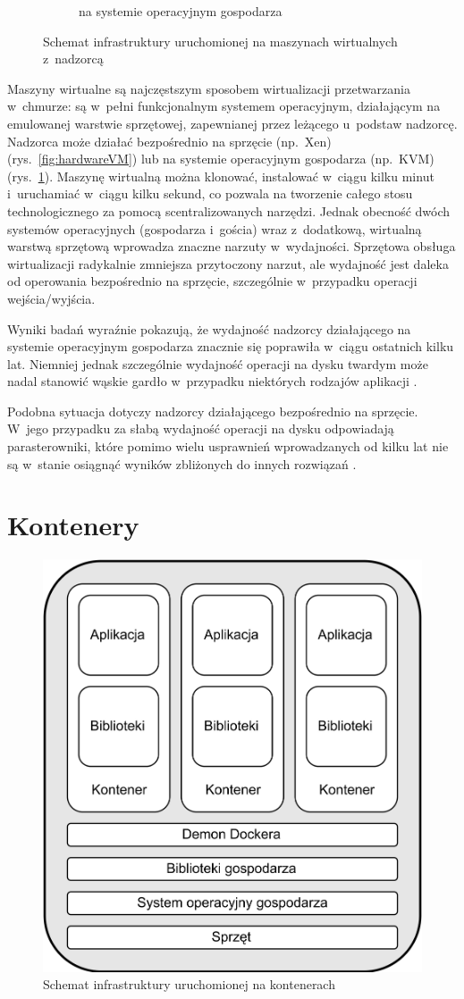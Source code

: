 \begin{figure}[ht]
\begin{subfigure}{0.5\textwidth}
        \caption{na systemie operacyjnym gospodarza}
        \label{fig:OSVM}
    \end{subfigure}
    \caption{Schemat infrastruktury uruchomionej na maszynach wirtualnych z~nadzorcą}
    \label{fig:VMs}
\end{figure}

Maszyny wirtualne są najczęstszym sposobem wirtualizacji przetwarzania w~chmurze: są w~pełni funkcjonalnym systemem operacyjnym, działającym na emulowanej warstwie sprzętowej, zapewnianej przez leżącego u~podstaw nadzorcę. Nadzorca może działać bezpośrednio na sprzęcie (np.~Xen)(rys.~\ref{fig:hardwareVM}) lub na systemie operacyjnym gospodarza (np.~KVM)(rys.~\ref{fig:OSVM}). Maszynę wirtualną można klonować, instalować w~ciągu kilku minut i~uruchamiać w~ciągu kilku sekund, co pozwala na tworzenie całego stosu technologicznego za pomocą scentralizowanych narzędzi. Jednak obecność dwóch systemów operacyjnych (gospodarza i~gościa) wraz z~dodatkową, wirtualną warstwą sprzętową wprowadza znaczne narzuty w~wydajności. Sprzętowa obsługa wirtualizacji radykalnie zmniejsza przytoczony narzut, ale wydajność jest daleka od operowania bezpośrednio na sprzęcie, szczególnie w~przypadku operacji wejścia/wyjścia.

Wyniki badań wyraźnie pokazują, że wydajność nadzorcy działającego na systemie operacyjnym gospodarza znacznie się poprawiła w~ciągu ostatnich kilku lat. Niemniej jednak szczególnie wydajność operacji na dysku twardym może nadal stanowić wąskie gardło w~przypadku niektórych rodzajów aplikacji \cite{MorabitoHypervisorsVSLightweightVirtualization}.

Podobna sytuacja dotyczy nadzorcy działającego bezpośrednio na sprzęcie. W~jego przypadku za słabą wydajność operacji na dysku odpowiadają parasterowniki, które pomimo wielu usprawnień wprowadzanych od kilku lat nie są w~stanie osiągnąć wyników zbliżonych do innych rozwiązań \cite{XavierPerformanceEvaluationOfContainerBasedVirtualizationForHighPerformanceComputingEnvironments}.

\section{Kontenery}

\begin{figure}[ht]
    \centering
    \includegraphics[width=0.45\linewidth]{images/container.png}
    \caption{Schemat infrastruktury uruchomionej na kontenerach}
    \label{fig:container}
\end{figure}

